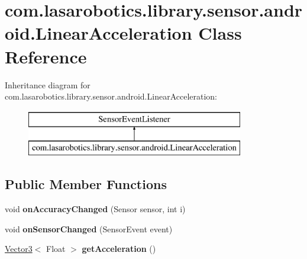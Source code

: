 \hypertarget{classcom_1_1lasarobotics_1_1library_1_1sensor_1_1android_1_1_linear_acceleration}{}\section{com.\+lasarobotics.\+library.\+sensor.\+android.\+Linear\+Acceleration Class Reference}
\label{classcom_1_1lasarobotics_1_1library_1_1sensor_1_1android_1_1_linear_acceleration}
Inheritance diagram for com.\+lasarobotics.\+library.\+sensor.\+android.\+Linear\+Acceleration\+:\begin{figure}[H]
\begin{center}
\leavevmode
\includegraphics[height=2.000000cm]{classcom_1_1lasarobotics_1_1library_1_1sensor_1_1android_1_1_linear_acceleration}
\end{center}
\end{figure}
\subsection*{Public Member Functions}
\begin{DoxyCompactItemize}
\item 
\hypertarget{classcom_1_1lasarobotics_1_1library_1_1sensor_1_1android_1_1_linear_acceleration_aa5b483fdaba04afd6eea346b788dabfb}{}void {\bfseries on\+Accuracy\+Changed} (Sensor sensor, int i)\label{classcom_1_1lasarobotics_1_1library_1_1sensor_1_1android_1_1_linear_acceleration_aa5b483fdaba04afd6eea346b788dabfb}

\item 
\hypertarget{classcom_1_1lasarobotics_1_1library_1_1sensor_1_1android_1_1_linear_acceleration_a6b5631b1f2884acd718af8385adebff7}{}void {\bfseries on\+Sensor\+Changed} (Sensor\+Event event)\label{classcom_1_1lasarobotics_1_1library_1_1sensor_1_1android_1_1_linear_acceleration_a6b5631b1f2884acd718af8385adebff7}

\item 
\hypertarget{classcom_1_1lasarobotics_1_1library_1_1sensor_1_1android_1_1_linear_acceleration_a19ddb08608afdd29e77360e9a6cd13e5}{}\hyperlink{classcom_1_1lasarobotics_1_1library_1_1util_1_1_vector3}{Vector3}$<$ Float $>$ {\bfseries get\+Acceleration} ()\label{classcom_1_1lasarobotics_1_1library_1_1sensor_1_1android_1_1_linear_acceleration_a19ddb08608afdd29e77360e9a6cd13e5}

\end{DoxyCompactItemize}



